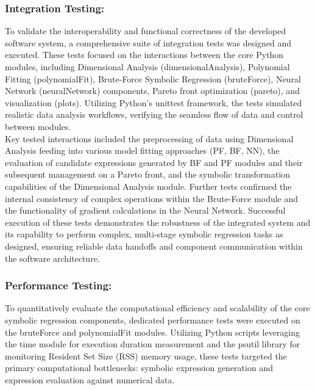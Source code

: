 \documentclass{article}
\begin{document}
{\subsubsection{Integration Testing: }


To validate the interoperability and functional correctness of the developed software system, a comprehensive suite of integration tests was designed and executed. These tests focused on the interactions between the core Python modules, including Dimensional Analysis (dimensionalAnalysis), Polynomial Fitting (polynomialFit), Brute-Force Symbolic Regression (bruteForce), Neural Network (neuralNetwork) components, Pareto front optimization (pareto), and visualization (plots). Utilizing Python's unittest framework, the tests simulated realistic data analysis workflows, verifying the seamless flow of data and control between modules.\\

Key tested interactions included the preprocessing of data using Dimensional Analysis feeding into various model fitting approaches (PF, BF, NN), the evaluation of candidate expressions generated by BF and PF modules and their subsequent management on a Pareto front, and the symbolic transformation capabilities of the Dimensional Analysis module. Further tests confirmed the internal consistency of complex operations within the Brute-Force module and the functionality of gradient calculations in the Neural Network. Successful execution of these tests demonstrates the robustness of the integrated system and its capability to perform complex, multi-stage symbolic regression tasks as designed, ensuring reliable data handoffs and component communication within the software architecture.\\


\subsubsection{Performance Testing: }

To quantitatively evaluate the computational efficiency and scalability of the core symbolic regression components, dedicated performance tests were executed on the bruteForce and polynomialFit modules. Utilizing Python scripts leveraging the time module for execution duration measurement and the psutil library for monitoring Resident Set Size (RSS) memory usage, these tests targeted the primary computational bottlenecks: symbolic expression generation and expression evaluation against numerical data.\\

}
\end{document}
